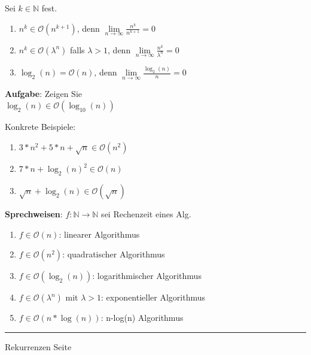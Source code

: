 \documentclass{slides}
\newcounter{mypage}
\newcommand{\bruch}[2]{\frac{\displaystyle#1}{\displaystyle#2}}
\newcommand{\Oh}{\mathcal{O}}
\begin{document}

\begin{slide}{}

\footnotesize
Sei $k \in \mathbb{N}$ fest.
\begin{enumerate}
\item $n^k \in \Oh(n^{k+1})$, \quad denn $\lim\limits_{n \rightarrow \infty} \bruch{n^k}{n^{k+1}} = 0$
\item $n^k \in \Oh(\lambda^n)$ falls $\lambda > 1$, denn  $\lim\limits_{n \rightarrow \infty} \bruch{n^k}{\lambda^n} = 0$ 
\item $\log_2(n) = \Oh(n)$, denn $\lim\limits_{n \rightarrow \infty} \bruch{\log_2(n)}{n} = 0$
\end{enumerate}

\textbf{Aufgabe}: Zeigen Sie \\[0.3cm]
\hspace*{1.3cm} $\log_{2}(n) \in \Oh(\log_{10}(n))$

Konkrete Beispiele:
\begin{enumerate}
\item $3 * n^2 + 5 * n + \sqrt{n} \in \Oh(n^2)$
\item $7 * n + \log_2(n)^2 \in \Oh(n)$
\item $\sqrt{n} + \log_2(n) \in \Oh\left(\sqrt{n}\right)$
\end{enumerate}

\textbf{Sprechweisen}: $f:\mathbb{N} \rightarrow  \mathbb{N}$ sei Rechenzeit eines Alg.
\begin{enumerate}
\item $f\in \Oh(n)$: linearer Algorithmus
\item $f\in \Oh(n^2)$: quadratischer Algorithmus
\item $f\in \Oh(\log_2(n))$: logarithmischer Algorithmus
\item $f\in \Oh(\lambda^n)$ mit $\lambda > 1$: exponentieller Algorithmus
\item $f\in \Oh(n*\log(n))$: n-log(n) Algorithmus
\end{enumerate}

\vspace*{\fill}
\tiny \addtocounter{mypage}{1}
\rule{17cm}{1mm}
Rekurrenzen  \hspace*{\fill} Seite 
\end{slide}

\end{document}
